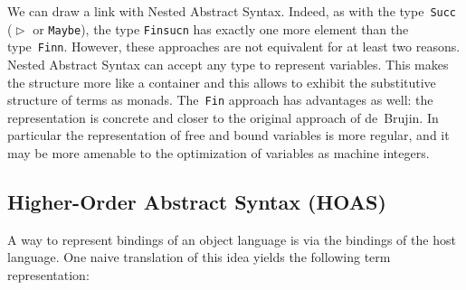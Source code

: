 \documentclass[9pt,preprint,authoryear]{sigplanconf}
\begin{document}
%
We can draw a link with Nested Abstract Syntax. Indeed,
    as with the type{~}\textcolor[rgb]{0,0,0.80}{\texttt{Succ}} (\textcolor[cmyk]{0,0.65,0.99,0}{\texttt{\makebox[1.22ex][l]{$ {(} $}}}\textcolor[rgb]{0,0,0.80}{\texttt{$ \vartriangleright $}}\textcolor[rgb]{0,0,0.80}{\texttt{\mbox{\hspace{0.50em}}}}\textcolor[cmyk]{0,0.65,0.99,0}{\texttt{\makebox[1.22ex][l]{$ {(} $}}}\textcolor[cmyk]{0,0.65,0.99,0}{\texttt{\makebox[1.22ex][r]{$ {)} $}}}\textcolor[cmyk]{0,0.65,0.99,0}{\texttt{\makebox[1.22ex][r]{$ {)} $}}} or \textcolor[rgb]{0,0,0.80}{\texttt{Maybe}}), the
    type \textcolor[rgb]{0,0,0.80}{\texttt{Fin}}\textcolor[rgb]{0,0,0.80}{\texttt{\mbox{\hspace{0.50em}}}}\textcolor[cmyk]{0,0.65,0.99,0}{\texttt{\makebox[1.22ex][l]{$ {(} $}}}\textcolor[rgb]{0,0,0.80}{\texttt{suc}}\textcolor[rgb]{0,0,0.80}{\texttt{\mbox{\hspace{0.50em}}}}\textcolor[rgb]{0,0,0.80}{\texttt{n}}\textcolor[cmyk]{0,0.65,0.99,0}{\texttt{\makebox[1.22ex][r]{$ {)} $}}} has exactly one more element than the
    type{~}\textcolor[rgb]{0,0,0.80}{\texttt{Fin}}\textcolor[rgb]{0,0,0.80}{\texttt{\mbox{\hspace{0.50em}}}}\textcolor[rgb]{0,0,0.80}{\texttt{n}}. However, these approaches are not equivalent for
    at least two reasons. Nested Abstract Syntax can accept any
    type to represent variables. This makes the structure more like a
    container and this allows to exhibit the substitutive 
    structure of terms as monads. The{~}\textcolor[rgb]{0,0,0.80}{\texttt{Fin}} approach has advantages as well{:} the
    representation is concrete and closer to the original
    approach of de{~}Brujin. In particular the representation of
    free and bound variables is more regular, and it may be more amenable
    to the optimization of variables as machine integers.%


\subsection{Higher-Order Abstract Syntax (HOAS)}

%
A way to represent bindings of an object language is via the
    bindings of the host language. One naive translation of this idea
    yields the following term representation{:}%


{\nopagebreak }
\end{document}
